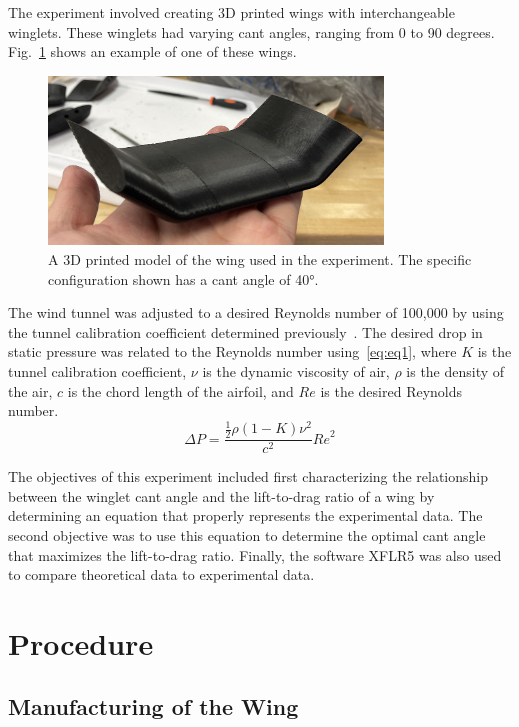 \documentclass[journal,letterpaper]{IEEEtran}
\begin{document}
The experiment involved creating 3D printed wings with interchangeable winglets.
These winglets had varying cant angles, ranging from 0 to 90 degrees.
Fig.~\ref{fig:wing} shows an example of one of these wings.
\begin{figure}[H]
    \centering
    \includegraphics[width=3.5in]{wing}
    \caption{A 3D printed model of the wing used in the experiment. The specific configuration shown has a cant angle of \ang{40}.}
    \label{fig:wing}
\end{figure}
\noindent
The wind tunnel was adjusted to a desired Reynolds number of 100,000 by using the tunnel calibration coefficient determined previously~\cite{lab1}.
The desired drop in static pressure was related to the Reynolds number using~\eqref{eq:eq1}, where $K$ is the tunnel calibration coefficient, $\nu$ is the dynamic viscosity of air, $\rho$ is the density of the air, $c$ is the chord length of the airfoil, and $Re$ is the desired Reynolds number.
\begin{equation} \label{eq:eq1}
    \Delta P = \frac{\frac{1}{2}\rho (1 - K)\nu^2}{c^2} {Re}^2
\end{equation}

The objectives of this experiment included first characterizing the relationship between the winglet cant angle and the lift-to-drag ratio of a wing by determining an equation that properly represents the experimental data.
The second objective was to use this equation to determine the optimal cant angle that maximizes the lift-to-drag ratio.
Finally, the software XFLR5 was also used to compare theoretical data to experimental data.


\section{Procedure}

\subsection{Manufacturing of the Wing}
\end{document}
